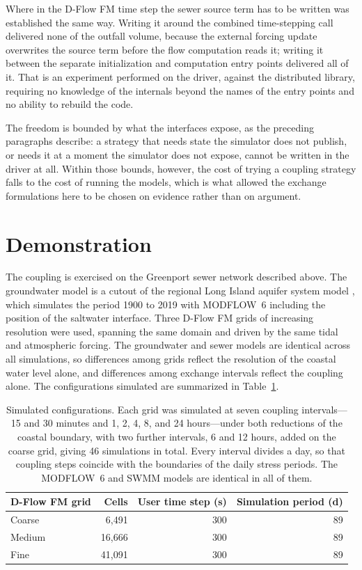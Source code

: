 \documentclass[preprint,authoryear,11pt]{elsarticle}
\begin{document}
Where in the D-Flow FM time step the sewer source term has to be written was established the same way. Writing it around the combined time-stepping call delivered none of the outfall volume, because the external forcing update overwrites the source term before the flow computation reads it; writing it between the separate initialization and computation entry points delivered all of it. That is an experiment performed on the driver, against the distributed library, requiring no knowledge of the internals beyond the names of the entry points and no ability to rebuild the code.

The freedom is bounded by what the interfaces expose, as the preceding paragraphs describe: a strategy that needs state the simulator does not publish, or needs it at a moment the simulator does not expose, cannot be written in the driver at all. Within those bounds, however, the cost of trying a coupling strategy falls to the cost of running the models, which is what allowed the exchange formulations here to be chosen on evidence rather than on argument.

\section{Demonstration}

The coupling is exercised on the Greenport sewer network described above. The groundwater model is a cutout of the regional Long Island aquifer system model \citep{walter2024longisland}, which simulates the period 1900 to 2019 with MODFLOW~6 including the position of the saltwater interface. Three D-Flow FM grids of increasing resolution were used, spanning the same domain and driven by the same tidal and atmospheric forcing. The groundwater and sewer models are identical across all simulations, so differences among grids reflect the resolution of the coastal water level alone, and differences among exchange intervals reflect the coupling alone. The configurations simulated are summarized in Table~\ref{tab:scenarios}.

\begin{table}[ht]
\centering
\caption{Simulated configurations. Each grid was simulated at seven coupling intervals---15 and 30 minutes and 1, 2, 4, 8, and 24 hours---under both reductions of the coastal boundary, with two further intervals, 6 and 12 hours, added on the coarse grid, giving 46 simulations in total. Every interval divides a day, so that coupling steps coincide with the boundaries of the daily stress periods. The MODFLOW~6 and SWMM models are identical in all of them.}
\label{tab:scenarios}
\begin{tabular}{lrrr}
\toprule
D-Flow FM grid & Cells & User time step (s) & Simulation period (d) \\
\midrule
Coarse  &  6,491 & 300 & 89 \\
Medium  & 16,666 & 300 & 89 \\
Fine    & 41,091 & 300 & 89 \\
\bottomrule
\end{tabular}
\end{table}
\end{document}
